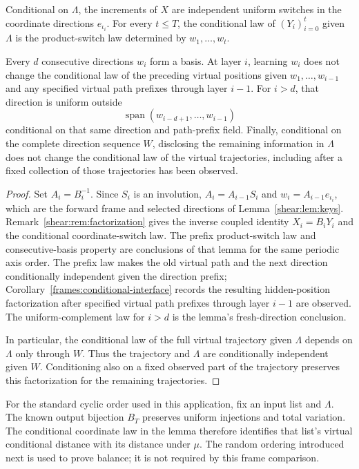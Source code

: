 \begin{lemma}
\label{frames:aux:directions}
Conditional on $\Lambda$, the increments of $X$ are independent
uniform switches in the coordinate directions $e_{\iota_i}$. For every
$t\le T$, the conditional law of $(Y_i)_{i=0}^t$ given $\Lambda$ is
the product-switch law determined by $w_1,\ldots,w_t$.

Every $d$ consecutive directions $w_i$ form a basis. At layer $i$,
learning $w_i$ does not change the conditional law of the preceding
virtual positions given $w_1,\ldots,w_{i-1}$ and any specified virtual
path prefixes through layer $i-1$. For $i>d$, that direction is uniform
outside
\[
 \operatorname{span}(w_{i-d+1},\ldots,w_{i-1})
\]
conditional on that same direction and path-prefix field. Finally,
conditional on the complete
direction sequence $W$, disclosing the remaining information in
$\Lambda$ does not change the conditional law of the virtual
trajectories, including after a fixed collection of those trajectories
has been observed.
\end{lemma}

\begin{proof}
Set $A_i=B_i^{-1}$. Since $S_i$ is an involution,
$A_i=A_{i-1}S_i$ and $w_i=A_{i-1}e_{\iota_i}$, which are the forward
frame and selected directions of Lemma~\ref{shear:lem:keys}.
Remark~\ref{shear:rem:factorization} gives the inverse coupled identity
$X_i=B_iY_i$ and the conditional coordinate-switch law. The prefix
product-switch law and consecutive-basis property are conclusions of
that lemma for the same periodic axis order. The prefix law makes the
old virtual path and the next direction conditionally independent given
the direction prefix; Corollary~\ref{frames:conditional-interface}
records the resulting hidden-position factorization after specified
virtual path prefixes through layer $i-1$ are observed. The
uniform-complement law for $i>d$ is
the lemma's fresh-direction conclusion.

In particular, the conditional law of the full virtual trajectory
given $\Lambda$ depends on $\Lambda$ only through $W$. Thus the
trajectory and $\Lambda$ are conditionally independent given $W$.
Conditioning also on a fixed observed part of the trajectory preserves
this factorization for the remaining trajectories.
\end{proof}

For the standard cyclic order used in this application, fix an input
list and $\Lambda$. The known output
bijection $B_T$ preserves uniform injections and total variation.
The conditional coordinate law in the lemma therefore identifies that
list's virtual conditional distance with its distance under $\mu$.
The random ordering introduced next is used to prove balance; it is not
required by this frame comparison.

